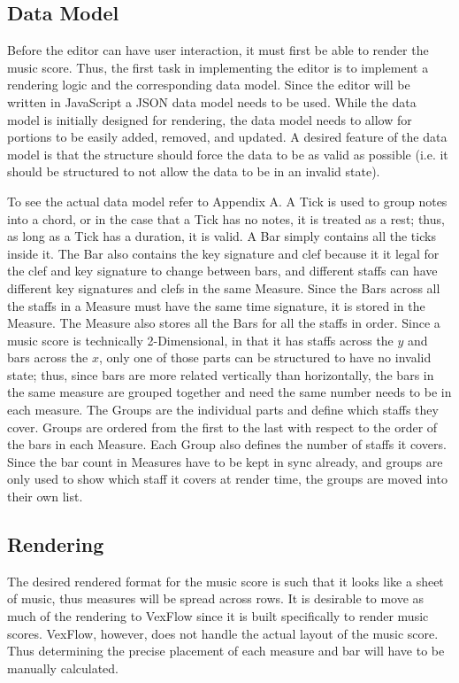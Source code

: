 \documentclass[letterpaper,12pt]{article}
\begin{document}
\subsection{Data Model}

Before the editor can have user interaction, it must first be able to render the music score. Thus, the first task in
implementing the editor is to implement a rendering logic and the corresponding data model. Since the editor will be
written in JavaScript a JSON data model needs to be used. While the data model is initially designed for rendering, the
data model needs to allow for portions to be easily added, removed, and updated. A desired feature of the data model is
that the structure should force the data to be as valid as possible (i.e. it should be structured to not allow the data
to be in an invalid state).

To see the actual data model refer to Appendix A. A Tick is used to group notes into a chord, or in the case that a Tick
has no notes, it is treated as a rest; thus, as long as a Tick has a duration, it is valid. A Bar simply contains all
the ticks inside it. The Bar also contains the key signature and clef because it it legal for the clef and key signature
to change between bars, and different staffs can have different key signatures and clefs in the same Measure. Since the
Bars across all the staffs in a Measure must have the same time signature, it is stored in the Measure. The Measure also
stores all the Bars for all the staffs in order. Since a music score is technically 2-Dimensional, in that it has staffs
across the $ y $ and bars across the $ x $, only one of those parts can be structured to have no invalid state; thus,
since bars are more related vertically than horizontally, the bars in the same measure are grouped together and need the
same number needs to be in each measure. The Groups are the individual parts and define which staffs they cover. Groups
are ordered from the first to the last with respect to the order of the bars in each Measure. Each Group also defines
the number of staffs it covers. Since the bar count in Measures have to be kept in sync already, and groups are only
used to show which staff it covers at render time, the groups are moved into their own list.

\subsection{Rendering}

The desired rendered format for the music score is such that it looks like a sheet of music, thus measures will be
spread across rows. It is desirable to move as much of the rendering to VexFlow since it is built specifically to render
music scores. VexFlow, however, does not handle the actual layout of the music score. Thus determining the precise 
placement of each measure and bar will have to be manually calculated. 
\end{document}
